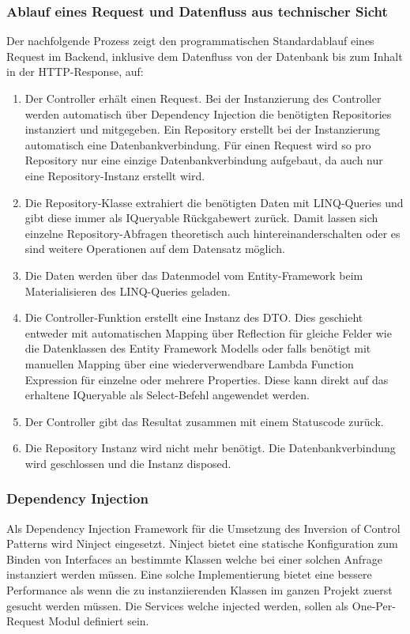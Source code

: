 \documentclass[a4paper,10pt,xetex]{article}
\begin{document}
\subsubsection{Ablauf eines Request und Datenfluss aus technischer Sicht}\label{ablauf-request}
Der nachfolgende Prozess zeigt den programmatischen Standardablauf eines Request im Backend, inklusive dem Datenfluss
von der Datenbank bis zum Inhalt in der HTTP-Response, auf:

\begin{enumerate}
  \item
    Der Controller erh\"alt einen Request. Bei der Instanzierung des Controller werden automatisch \"uber Dependency Injection
    die ben\"otigten Repositories instanziert und mitgegeben. Ein Repository erstellt bei der Instanzierung automatisch
    eine Datenbankverbindung. F\"ur einen Request wird so pro Repository nur eine einzige Datenbankverbindung aufgebaut, da
    auch nur eine Repository-Instanz erstellt wird.
  \item
    Die Repository-Klasse extrahiert die ben\"otigten Daten mit LINQ-Queries und gibt diese immer als IQueryable
    R\"uckgabewert zur\"uck. Damit lassen sich einzelne Repository-Abfragen theoretisch auch hintereinanderschalten oder es
    sind weitere Operationen auf dem Datensatz m\"oglich.
  \item
    Die Daten werden \"uber das Datenmodel vom Entity-Framework beim Materialisieren des LINQ-Queries geladen.
  \item
    Die Controller-Funktion erstellt eine Instanz des DTO. Dies geschieht entweder mit automatischen Mapping \"uber
    Reflection f\"ur gleiche Felder wie die Datenklassen des Entity Framework Modells oder falls ben\"otigt mit manuellen
    Mapping \"uber eine wiederverwendbare Lambda Function Expression f\"ur einzelne oder mehrere Properties. Diese kann
    direkt auf das erhaltene IQueryable als Select-Befehl angewendet werden.
  \item
    Der Controller gibt das Resultat zusammen mit einem Statuscode zur\"uck.
  \item
    Die Repository Instanz wird nicht mehr ben\"otigt. Die Datenbankverbindung wird geschlossen und die Instanz disposed.
\end{enumerate}

\newpage
\subsubsection{Dependency Injection}\label{dependency-injection}
Als Dependency Injection Framework f\"ur die Umsetzung des Inversion of Control Patterns wird Ninject eingesetzt.
Ninject bietet eine statische Konfiguration zum Binden von Interfaces an bestimmte Klassen welche bei einer solchen
Anfrage instanziert werden m\"ussen. Eine solche Implementierung bietet eine bessere Performance als wenn die zu
instanziierenden Klassen im ganzen Projekt zuerst gesucht werden m\"ussen. Die Services welche injected werden, sollen
als One-Per-Request Modul definiert sein.
\end{document}
